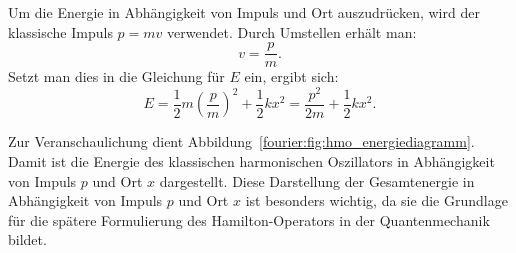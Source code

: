 Um die Energie in Abhängigkeit von Impuls und Ort auszudrücken, wird der klassische Impuls \( p = m v \) verwendet.  
Durch Umstellen erhält man:  
\[
	v = \frac{p}{m}.  
\]  
Setzt man dies in die Gleichung für \( E \) ein, ergibt sich:  
\begin{equation}\label{fourier:equation:derKlassischeHarmonischeOszillator}  
	E = \frac{1}{2} m {\left(\frac{p}{m}\right)}^{2} + \frac{1}{2} k x^{2} = \frac{p^{2}}{2m} + \frac{1}{2} k x^{2}.
\end{equation}



Zur Veranschaulichung dient Abbildung~\ref{fourier:fig:hmo_energiediagramm}.
Damit ist die Energie des klassischen harmonischen Oszillators in Abhängigkeit von Impuls \( p \) und Ort \( x \) dargestellt.  
Diese Darstellung der Gesamtenergie in Abhängigkeit von Impuls \( p \) und Ort \( x \) ist besonders wichtig,  
da sie die Grundlage für die spätere Formulierung des Hamilton-Operators in der Quantenmechanik bildet.
